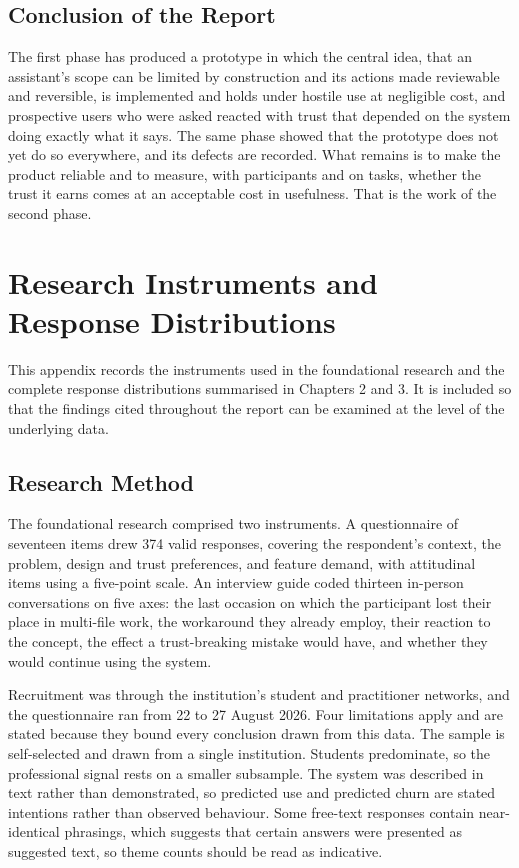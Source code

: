 \documentclass{FastFyp}
\begin{document}
\section{Conclusion of the Report}
The first phase has produced a prototype in which the central idea, that an assistant's scope can be limited by construction and its actions made reviewable and reversible, is implemented and holds under hostile use at negligible cost, and prospective users who were asked reacted with trust that depended on the system doing exactly what it says. The same phase showed that the prototype does not yet do so everywhere, and its defects are recorded. What remains is to make the product reliable and to measure, with participants and on tasks, whether the trust it earns comes at an acceptable cost in usefulness. That is the work of the second phase.


{


}

\appendix
\chapter{Research Instruments and Response Distributions}
This appendix records the instruments used in the foundational research and the complete response distributions summarised in Chapters 2 and 3. It is included so that the findings cited throughout the report can be examined at the level of the underlying data.

\section{Research Method}
The foundational research comprised two instruments. A questionnaire of seventeen items drew 374 valid responses, covering the respondent's context, the problem, design and trust preferences, and feature demand, with attitudinal items using a five-point scale. An interview guide coded thirteen in-person conversations on five axes: the last occasion on which the participant lost their place in multi-file work, the workaround they already employ, their reaction to the concept, the effect a trust-breaking mistake would have, and whether they would continue using the system.

Recruitment was through the institution's student and practitioner networks, and the questionnaire ran from 22 to 27 August 2026. Four limitations apply and are stated because they bound every conclusion drawn from this data. The sample is self-selected and drawn from a single institution. Students predominate, so the professional signal rests on a smaller subsample. The system was described in text rather than demonstrated, so predicted use and predicted churn are stated intentions rather than observed behaviour. Some free-text responses contain near-identical phrasings, which suggests that certain answers were presented as suggested text, so theme counts should be read as indicative.
\end{document}
